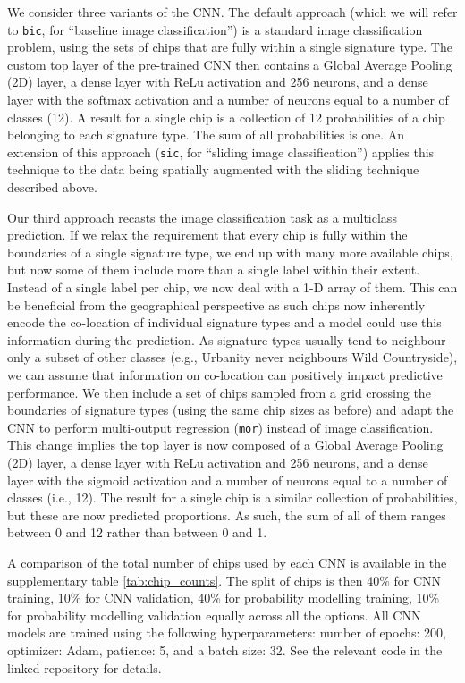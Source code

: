 We consider three variants of the CNN.
The default approach (which we will refer to \texttt{bic}, for ``baseline
image classification'') is a standard image classification problem, using the sets of chips
that are fully within a single signature type. The custom top layer of the pre-trained CNN then contains a Global Average
Pooling (2D) layer, a dense layer with ReLu activation and 256 neurons, and a dense
layer with the softmax activation and a number of neurons equal to a number of classes
(12). A result for a single chip is a collection of 12 probabilities
of a chip belonging to each signature type. The sum of all probabilities is
one.
An extension of this approach (\texttt{sic}, for ``sliding image
classification'') applies this technique to the data being spatially augmented
with the sliding technique described above.

Our third approach recasts the image classification task as a multiclass
prediction. If we relax the requirement that every chip is fully within
the boundaries of a single signature type, we end up with many more available
chips, but now some of them include more than a single label within their
extent. Instead of a single label per chip, we now deal with a 1-D array of them.
This can be beneficial from the geographical perspective as such chips now inherently
encode the co-location of individual signature types and a model could use this information
during the prediction. As signature types usually tend to neighbour only a subset of
other classes (e.g., Urbanity never neighbours Wild Countryside), we can assume that
information on co-location can positively impact predictive performance. We
then include a set of chips sampled from a grid crossing the boundaries of
signature types (using the same chip sizes as before) and adapt the CNN to
perform multi-output regression (\texttt{mor}) instead of image classification. This change
implies the top layer is now composed of a Global Average Pooling (2D) layer, a
dense layer with ReLu
activation and 256 neurons, and a dense layer with the sigmoid activation and a number of
neurons equal to a number of classes (i.e., 12). The result for a single chip is a similar
collection of probabilities, but these are now predicted proportions. As such,
the sum of all of them ranges between 0 and 12 rather than between 0 and 1.

A comparison of the total
number of chips used by each CNN is available in the supplementary table \ref{tab:chip_counts}.
The split of chips is then 40\% for CNN training, 10\% for CNN validation, 40\% for
probability modelling training, 10\% for probability modelling validation equally across all the options.
All CNN models are trained using the following hyperparameters: number of
epochs: 200, optimizer: Adam, patience: 5, and a batch size: 32. See the relevant code
in the linked repository for details.

